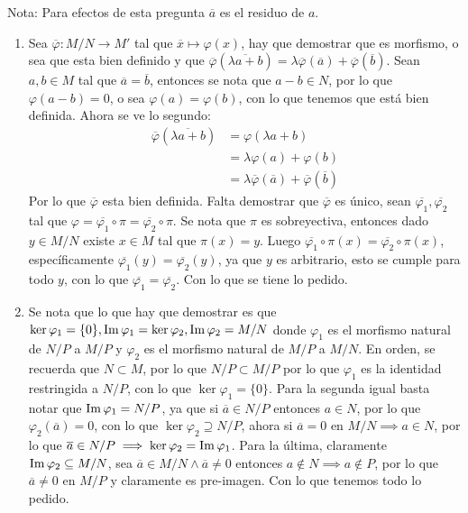 \begin{sol}{2.49}
    Nota: Para efectos de esta pregunta \(\overline{a}\) es el residuo de \(a\).
    \begin{enumerate}
        \item Sea \(\overline{\varphi}:M/N\rightarrow M'\) tal que \(\overline{x}\mapsto \varphi(x)\), hay que demostrar que es morfismo, o sea que esta bien definido y que \(\overline{\varphi}(\overline{\lambda a+b})=\lambda\overline{\varphi}(\overline{a})+\overline{\varphi}(\overline{b})\). Sean \(a,b\in M\) tal que \(\overline{a}=\overline{b}\), entonces se nota que \(a-b\in N\), por lo que \(\varphi(a-b)=0\), o sea \(\varphi(a)=\varphi(b)\), con lo que tenemos que está bien definida. Ahora se ve lo segundo:
        \begin{align*}
            \overline{\varphi}(\overline{\lambda a+b}) &= \varphi(\lambda a+b)\\
            &=\lambda\varphi(a)+\varphi(b)\\
            &=\lambda \overline{\varphi}(\overline{a})+\overline{\varphi}(\overline{b})
        \end{align*}
        Por lo que \(\overline{\varphi}\) esta bien definida. Falta demostrar que \(\overline{\varphi}\) es único, sean \(\overline{\varphi_1},\overline{\varphi_2}\) tal que \(\varphi=\overline{\varphi_1}\circ\pi=\overline{\varphi_2}\circ\pi\). Se nota que \(\pi\) es sobreyectiva, entonces dado \(y\in M/N\) existe \(x\in M\) tal que \(\pi(x)=y\). Luego \(\overline{\varphi_1}\circ\pi(x)=\overline{\varphi_2}\circ\pi(x)\), específicamente \(\overline{\varphi_1}(y)=\overline{\varphi_2}(y)\), ya que \(y\) es arbitrario, esto se cumple para todo \(y\), con lo que \(\overline{\varphi_1}=\overline{\varphi_2}\). Con lo que se tiene lo pedido.
        \item Se nota que lo que hay que demostrar es que \(\ker\varphi_1=\{0\},\operatorname{Im}\varphi_1=\ker\varphi_2,\operatorname{Im}\varphi_2=M/N\) donde \(\varphi_1\) es el morfismo natural de \(N/P\) a \(M/P\) y \(\varphi_2\) es el morfismo natural de \(M/P\) a \(M/N\). En orden, se recuerda que \(N\subset M\), por lo que \(N/P\subset M/P\) por lo que \(\varphi_1\) es la identidad restringida a \(N/P\), con lo que \(\ker\varphi_1=\{0\}\). Para la segunda igual basta notar que \(\operatorname{Im}\varphi_1=N/P\), ya que si \(\overline{a}\in N/P\) entonces \(a\in N\), por lo que \(\varphi_2(\overline{a})=0\), con lo que \(\ker\varphi_2\supseteq N/P\), ahora si \(\overline{a}=0\) en \(M/N \implies a\in N\), por lo que \(\overline{a}\in N/P\implies \ker\varphi_2=\operatorname{Im}\varphi_1\). Para la última, claramente \(\operatorname{Im}\varphi_2\subseteq M/N\), sea \(\overline{a}\in M/N\wedge\overline{a}\neq 0\) entonces \(a\notin N\implies a\notin P\), por lo que \(\overline{a}\neq 0\) en \(M/P\) y claramente es pre-imagen. Con lo que tenemos todo lo pedido.

\end{enumerate}
\end{sol}
